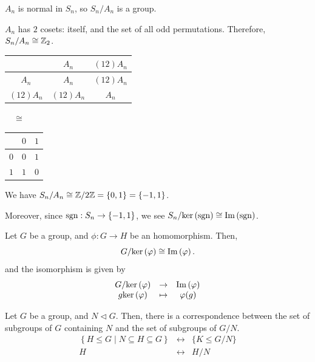 \begin{example}
    $A_n$ is normal in $S_n$, so $S_n/A_n$ is a group.

    $A_n$ has $2$ cosets: itself, and the set of all odd permutations. Therefore, $S_n/A_n \cong \mathbb{Z}_2$.

    \begin{center}
        \begin{tabular}{c|c|c}
                      & $A_n$     & $(12)A_n$ \\ \hline
            $A_n$     & $A_n$     & $(12)A_n$ \\ \hline
            $(12)A_n$ & $(12)A_n$ & $A_n$
        \end{tabular}
        $\quad \cong \quad$
        \begin{tabular}{c|c|c}
                & $0$ & $1$ \\ \hline
            $0$ & $0$ & $1$ \\ \hline
            $1$ & $1$ & $0$
        \end{tabular}
    \end{center}

    We have $S_n/A_n \cong \mathbb{Z}/2\mathbb{Z} = \{ 0, 1 \} = \{ -1, 1 \}$.
    
    Moreover, since $\mathrm{sgn}: S_n \to \{ -1, 1 \}$, we see $S_n/\mathrm{ker}\left( \mathrm{sgn} \right) \cong \mathrm{Im}\left( \mathrm{sgn} \right)$. 
\end{example}

\begin{theorem}\label{thm:first-isomorphism}
    Let $G$ be a group, and $\phi: G \to H$ be an homomorphism. Then, \[
        G/\mathrm{ker}\left( \varphi \right) \cong \mathrm{Im}\left( \varphi \right).
    \] and the isomorphism is given by \[
        \begin{matrix}
            G/\mathrm{ker}\left( \varphi \right) & \to & \mathrm{Im}\left( \varphi \right) \\
            g\mathrm{ker}\left( \varphi \right) & \mapsto & \varphi(g)
        \end{matrix}
    \]
\end{theorem}

\begin{theorem}\label{thm:correspondence}
    Let $G$ be a group, and $N \triangleleft G$. Then, there is a correspondence between the set of subgroups of $G$ containing $N$ and the set of subgroups of $G/N$. \[
        \begin{matrix}
            \left\{ H \le G \mid N \subseteq H \subseteq G \right\} & \longleftrightarrow & \{ K \le G/N \} \\
            H & \longleftrightarrow & H/N
        \end{matrix}
    \]
\end{theorem}

